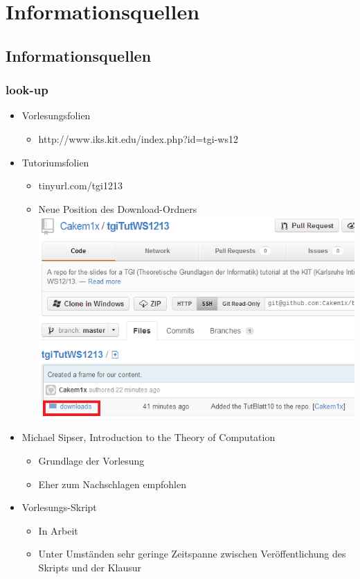 




\section{Informationsquellen}
\subsection{Informationsquellen}
\begin{frame}
\frametitle{look-up}
\begin{itemize}
	\item Vorlesungsfolien
	\begin{itemize}
		\item http://www.iks.kit.edu/index.php?id=tgi-ws12
	\end{itemize}
	\item Tutoriumsfolien
	\begin{itemize}
		\item tinyurl.com/tgi1213
		\item Neue Position des Download-Ordners~\\
		\includegraphics[scale=0.2]{images/download.png}
	\end{itemize}
	\item Michael Sipser, Introduction to the Theory of Computation
	\begin{itemize}
		\item Grundlage der Vorlesung
		\item Eher zum Nachschlagen empfohlen
	\end{itemize}
	\item Vorlesungs-Skript
	\begin{itemize}
		\item In Arbeit
		\item Unter Umständen sehr geringe Zeitspanne zwischen Veröffentlichung des Skripts und der Klausur
	\end{itemize}
\end{itemize}
\end{frame}


